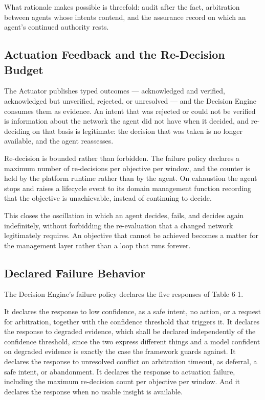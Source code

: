 What rationale makes possible is threefold: audit after the fact,
arbitration between agents whose intents contend, and the assurance
record on which an agent's continued authority rests.

\hypertarget{actuation-feedback-and-the-re-decision-budget}{%
\subsection{Actuation Feedback and the Re-Decision Budget}\label{actuation-feedback-and-the-re-decision-budget}}

The Actuator publishes typed outcomes --- acknowledged and verified,
acknowledged but unverified, rejected, or unresolved --- and the
Decision Engine consumes them as evidence. An intent that was rejected
or could not be verified is information about the network the agent did
not have when it decided, and re-deciding on that basis is legitimate:
the decision that was taken is no longer available, and the agent
reassesses.

Re-decision is bounded rather than forbidden. The failure policy
declares a maximum number of re-decisions per objective per window, and
the counter is held by the platform runtime rather than by the agent. On
exhaustion the agent stops and raises a lifecycle event to its domain
management function recording that the objective is unachievable,
instead of continuing to decide.

This closes the oscillation in which an agent decides, fails, and
decides again indefinitely, without forbidding the re-evaluation that a
changed network legitimately requires. An objective that cannot be
achieved becomes a matter for the management layer rather than a loop
that runs forever.

\hypertarget{declared-failure-behavior-2}{%
\subsection{Declared Failure Behavior}\label{declared-failure-behavior-2}}

The Decision Engine's failure policy declares the five responses of
Table 6-1.

It declares the response to low confidence, as a safe intent, no action,
or a request for arbitration, together with the confidence threshold
that triggers it. It declares the response to degraded evidence, which
shall be declared independently of the confidence threshold, since the
two express different things and a model confident on degraded evidence
is exactly the case the framework guards against. It declares the
response to unresolved conflict on arbitration timeout, as deferral, a
safe intent, or abandonment. It declares the response to actuation
failure, including the maximum re-decision count per objective per
window. And it declares the response when no usable insight is
available.

